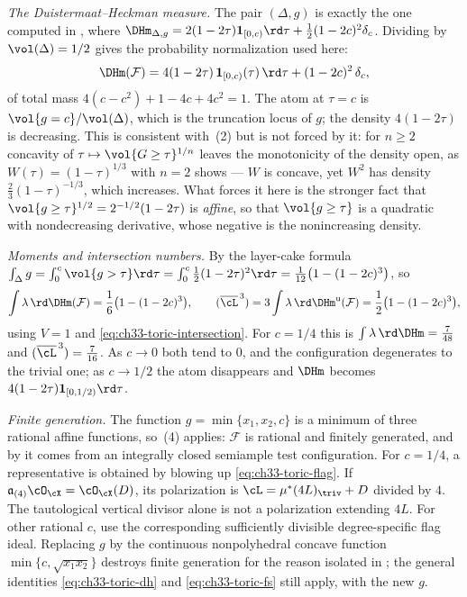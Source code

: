 \begin{example}
\emph{The Duistermaat--Heckman measure.}  The pair $(\Delta,g)$ is exactly
the one computed in , where
$\DHm_{\Delta,g}
=2(1-2\tau)\mathbf 1_{[0,c)}\rd\tau+\tfrac12(1-2c)^2\delta_c$.  Dividing by
$\vol(\Delta)=1/2$ gives the probability normalization used here:
\begin{equation}
\label{eq:ch33-toric-p2-dh}
 \DHm(\mathcal F)
 =4(1-2\tau)\,\mathbf 1_{[0,c)}(\tau)\,\rd\tau
   +(1-2c)^2\,\delta_c ,
\end{equation}
of total mass $4(c-c^2)+1-4c+4c^2=1$.  The atom at $\tau=c$ is
$\vol\{g=c\}/\vol(\Delta)$, which is the truncation locus of $g$; the
density $4(1-2\tau)$ is decreasing.  This is consistent with
\,(2) but is not forced by it: for $n\geq2$
concavity of $\tau\mapsto\vol\{G\geq\tau\}^{1/n}$ leaves the monotonicity
of the density open, as $W(\tau)=(1-\tau)^{1/3}$ with $n=2$ shows ---
$W$ is concave, yet $W^2$ has density $\tfrac23(1-\tau)^{-1/3}$, which
increases.  What forces it here is the stronger fact that
$\vol\{g\geq\tau\}^{1/2}=2^{-1/2}(1-2\tau)$ is \emph{affine}, so that
$\vol\{g\geq\tau\}$ is a quadratic with nondecreasing derivative, whose negative is the
nonincreasing density.

\emph{Moments and intersection numbers.}  By the layer-cake formula
$\int_\Delta g=\int_0^c\vol\{g>\tau\}\rd\tau
=\int_0^c\tfrac12(1-2\tau)^2\rd\tau=\tfrac1{12}\bigl(1-(1-2c)^3\bigr)$, so
\[
 \int\lambda\,\rd\DHm(\mathcal F)=\frac16\bigl(1-(1-2c)^3\bigr),
 \qquad
 (\overline\cL^{\,3})
 =3\int\lambda\,\rd\DHm^{\mathrm u}(\mathcal F)
 =\frac12\bigl(1-(1-2c)^3\bigr),
\]
using $V=1$ and \eqref{eq:ch33-toric-intersection}.  For $c=1/4$ this is
$\int\lambda\,\rd\DHm=\tfrac7{48}$ and
$(\overline\cL^{\,3})=\tfrac7{16}$.  As $c\to0$ both tend to $0$, and
the configuration degenerates to the trivial one; as $c\to1/2$ the atom
disappears and $\DHm$ becomes $4(1-2\tau)\mathbf 1_{[0,1/2)}\rd\tau$.

\emph{Finite generation.}  The function $g=\min\{x_1,x_2,c\}$ is a minimum
of three rational affine functions, so
\,(4) applies: $\mathcal F$ is rational and finitely
generated, and by  it comes from an
integrally closed semiample test configuration.  For $c=1/4$, a representative is obtained by blowing up
\eqref{eq:ch33-toric-flag}.  If $\mathfrak a_{(4)}\cO_{\cX}=\cO_{\cX}(D)$,
its polarization is
$\cL=\mu^\ast(4L)_{\triv}+D$ divided by $4$.
The tautological vertical divisor alone is not a polarization extending
$4L$.  For other rational $c$, use the corresponding sufficiently
divisible degree-specific flag ideal.  Replacing $g$ by the
continuous nonpolyhedral concave function
$\min\{c,\sqrt{x_1x_2}\}$ destroys finite generation for the reason
isolated in ; the general identities
\eqref{eq:ch33-toric-dh} and \eqref{eq:ch33-toric-fs} still apply, with the
new $g$.
\end{example}

